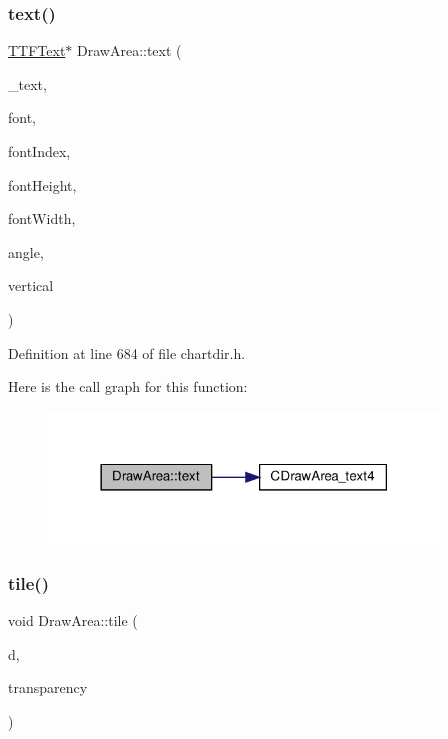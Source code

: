 \subsubsection{\texorpdfstring{text()}{text()}\hspace{0.1cm}{\footnotesize\ttfamily [8/8]}}
{\footnotesize\ttfamily \hyperlink{class_t_t_f_text}{T\+T\+F\+Text}$\ast$ Draw\+Area\+::text (\begin{DoxyParamCaption}\item[{const char $\ast$}]{\+\_\+text,  }\item[{const char $\ast$}]{font,  }\item[{int}]{font\+Index,  }\item[{double}]{font\+Height,  }\item[{double}]{font\+Width,  }\item[{double}]{angle,  }\item[{bool}]{vertical }\end{DoxyParamCaption})\hspace{0.3cm}{\ttfamily [inline]}}



Definition at line 684 of file chartdir.\+h.

Here is the call graph for this function\+:
\nopagebreak
\begin{figure}[H]
\begin{center}
\leavevmode
\includegraphics[width=294pt]{class_draw_area_ad861166eb9e2280d51a0e68dd03f496b_cgraph}
\end{center}
\end{figure}
\mbox{\label{class_draw_area_af73b2087afdb68990aa4f1ccfb2bcb03}} 
\subsubsection{\texorpdfstring{tile()}{tile()}}
{\footnotesize\ttfamily void Draw\+Area\+::tile (\begin{DoxyParamCaption}\item[{const \hyperlink{class_draw_area}{Draw\+Area} $\ast$}]{d,  }\item[{int}]{transparency }\end{DoxyParamCaption})\hspace{0.3cm}{\ttfamily [inline]}}



